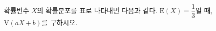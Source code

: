 확률변수 $X$의 확률분포를 표로 나타내면 다음과 같다. $\mathrm{E}(X)=\dfrac{1}{3}$일 때, $\mathrm{V}(aX+b)$를 구하시오. 
\par\smallskip\begin{center}\resizebox{\ifdim\width>\linewidth\linewidth\else\width\fi}{!}{}\end{center}
